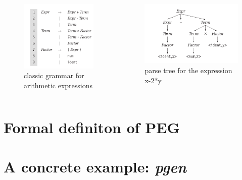 \documentclass{beamer}
\begin{document}
    \begin{frame}
       \begin{columns}
           \begin{column}{0.4\textwidth}
               \begin{figure}
                   \includegraphics[width=\textwidth]{img/cfg.png}
                   \caption{classic grammar for arithmetic expressions}
               \end{figure}
           \end{column}
           \begin{column}{0.6\textwidth}
            \begin{figure}
                \includegraphics[width=\textwidth]{img/parse.png}
                \caption{parse tree for the expression x-2*y}
            \end{figure}
               
           \end{column}
       \end{columns}
    \end{frame}
    \section{Formal definiton of PEG}
    \section{A concrete example: \emph{pgen}}
\end{document}
